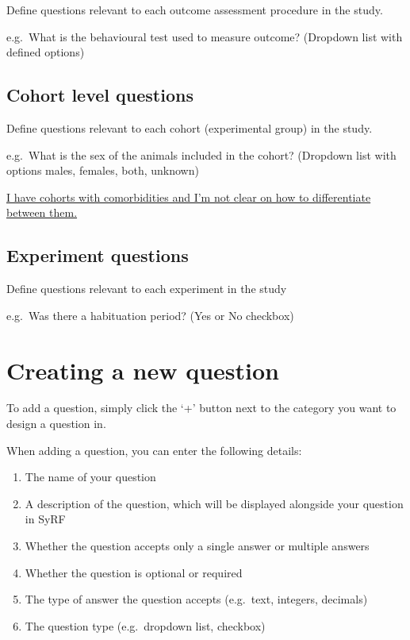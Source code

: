 \documentclass[
]{book}
\providecommand{\tightlist}{%
  \setlength{\itemsep}{0pt}\setlength{\parskip}{0pt}}
\begin{document}
Define questions relevant to each outcome assessment procedure in the study.

e.g.~What is the behavioural test used to measure outcome?
(Dropdown list with defined options)

\hypertarget{cohort-level-questions}{%
\subsection{Cohort level questions}\label{cohort-level-questions}}

Define questions relevant to each cohort (experimental group) in the study.

e.g.~What is the sex of the animals included in the cohort?
(Dropdown list with options males, females, both, unknown)

\href{https://syrf.org.uk/faq}{I have cohorts with comorbidities and I'm not clear on how to differentiate between them.}

\hypertarget{experiment-questions}{%
\subsection{Experiment questions}\label{experiment-questions}}

Define questions relevant to each experiment in the study

e.g.~Was there a habituation period?
(Yes or No checkbox)

\hypertarget{creating-a-new-question}{%
\section{Creating a new question}\label{creating-a-new-question}}

To add a question, simply click the `+' button next to the category you want to design a question in.

When adding a question, you can enter the following details:

\begin{enumerate}
\def\labelenumi{\arabic{enumi}.}
\tightlist
\item
  The name of your question
\item
  A description of the question, which will be displayed alongside your question in SyRF
\item
  Whether the question accepts only a single answer or multiple answers
\item
  Whether the question is optional or required
\item
  The type of answer the question accepts (e.g.~text, integers, decimals)
\item
  The question type (e.g.~dropdown list, checkbox)
\end{enumerate}
\end{document}
